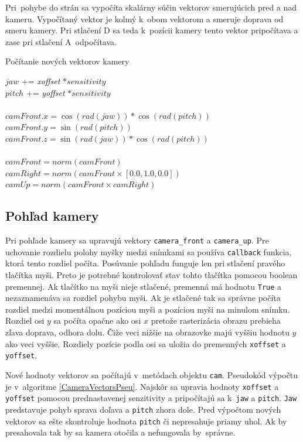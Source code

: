 Pri~pohybe do strán sa vypočíta skalárny súčin vektorov smerujúcich pred a nad kameru. Vypočítaný vektor je kolmý k~obom vektorom a smeruje doprava od smeru kamery. Pri stlačení D sa teda k~pozícii kamery tento vektor pripočítava a zase pri stlačení A~odpočítava.

\begin{algorithm}[b!]
\caption{Počítanie nových vektorov kamery}\label{CameraVectorsPseu}
$jaw$ += \textit{xoffset} $* sensitivity$    \\
$pitch$ += \textit{yoffset} $* sensitivity$  \\
\texttt{\\}
$camFront.x = \cos(rad(jaw)) * \cos(rad(pitch))$ \\
$camFront.y = \sin(rad(pitch))$                  \\
$camFront.z = \sin(rad(jaw)) * \cos(rad(pitch))$ \\
\texttt{\\}
$camFront = norm(camFront)$\\
$camRight = norm(camFront \times [0.0, 1.0, 0.0])$\\
$camUp = norm(camFront \times camRight)$
\end{algorithm}

\subsection*{Pohľad kamery}
Pri pohľade kamery sa upravujú vektory \verb|camera_front| a \verb|camera_up|. Pre uchovanie rozdielu polohy myšky medzi snímkami sa používa \verb|callback| funkcia, ktorá tento rozdiel počíta. Posúvanie pohľadu funguje len pri stlačení pravého tlačítka myši. Preto je potrebné kontrolovať stav tohto tlačítka pomocou boolean premennej. Ak tlačítko na myši nieje stlačené, premenná má hodnotu \verb|True| a nezaznamenáva sa rozdiel pohybu myši. Ak je stlačené tak sa správne počíta rozdiel medzi momentálnou pozíciou myši a pozíciou myši na minulom snímku. Rozdiel osi $y$ sa počíta opačne ako osi $x$ pretože rasterizácia obrazu prebieha zľava doprava, odhora dolu. Čiže veci nižšie na obrazovke majú vyššiu hodnotu $y$ ako veci vyššie. Rozdiely pozície podla osi sa uložia do premenných \verb|xoffset| a \verb|yoffset|.

Nové hodnoty vektorov sa počítajú v~metódach objektu \verb|cam|. Pseudokód výpočtu je v~algoritme \ref{CameraVectorsPseu}. Najskôr sa upravia hodnoty \verb|xoffset| a \verb|yoffset| pomocou prednastavenej senzitivity a pripočítajú sa k~\verb|jaw| a \verb|pitch|. \verb|Jaw| predstavuje pohyb sprava doľava a \verb|pitch| zhora dole. Pred výpočtom nových vektorov sa ešte skontroluje hodnota \verb|pitch| či nepresahuje priamy uhol. Ak by presahovala tak by sa kamera otočila a nefungovala by~správne.

